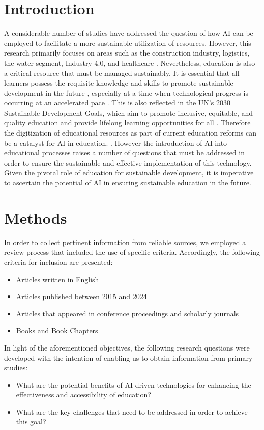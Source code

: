\documentclass[]{lni}
\begin{document}
\section{Introduction}
%
A considerable number of studies have addressed the question of how AI can be employed to facilitate a more sustainable utilization of resources. However, 
this research primarily focuses on areas such as the construction industry, logistics, the water segment, Industry 4.0, and healthcare 
\cite{KAR2022134120}.
Nevertheless, education is also a critical resource that must be managed sustainably. It is essential that all learners possess the requisite knowledge and 
skills to promote sustainable development in the future 
\cite{OFlaherty2018}, especially at a time when technological progress is occurring at an accelerated pace \cite{Judijanto2022}.
This is also reflected in the UN's 2030 Sustainable Development Goals, which aim to promote inclusive, equitable, and quality education and provide 
lifelong learning opportunities for all
\cite{un_sdg4}. 
Therefore the digitization of educational resources as part of current education reforms can be a catalyst for AI in education. \cite{KAMYAB2023101566} \cite{cai2021review}.
However the introduction of AI into educational processes raises a number of questions that must be addressed in order to ensure the 
sustainable and effective implementation of this technology.
Given the pivotal role of education for sustainable development, it is imperative to ascertain the potential of AI in ensuring sustainable education in the future.
%
%
\section{Methods}
In order to collect pertinent information from reliable sources, we employed a review process that included the use of specific criteria. Accordingly, the following criteria for inclusion are presented:
\begin{itemize}
    \hangindent=0.5in
    \item Articles written in English
    \item Articles published between 2015 and 2024
    \item Articles that appeared in conference proceedings and scholarly journals
    \item Books and Book Chapters
\end{itemize}

In light of the aforementioned objectives, the following research questions were developed with the intention of enabling us to obtain information from primary studies:
\begin{itemize}
    \hangindent=0.5in
    \item What are the potential benefits of AI-driven technologies for enhancing the effectiveness and accessibility of education?
    \item What are the key challenges that need to be addressed in order to achieve this goal?
\end{itemize}
%
%
%
\end{document}
